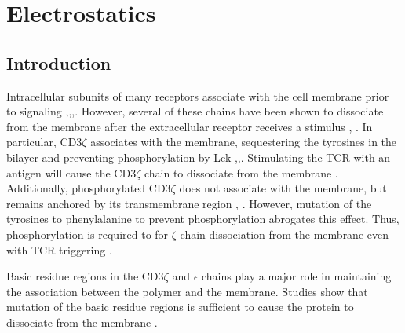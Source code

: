 \documentclass[../../AdvancementSummary.tex]{subfiles}
\begin{document}
\section{Electrostatics}

\subsection{Introduction}

Intracellular subunits of many receptors associate with the cell membrane prior to signaling \cite{Xu2008},\cite{Shi2013},\cite{Zhang2011},\cite{Dobbins2016}. 
However, several of these chains have been shown to dissociate from the membrane after the extracellular receptor receives a stimulus \cite{Zhang2011}, \cite{Dobbins2016}.
In particular, CD3$\zeta$ associates with the membrane, sequestering the tyrosines in the bilayer and preventing phosphorylation by Lck \cite{Aivazian2000},\cite{Zhang2011},\cite{Shi2013}.
Stimulating the TCR with an antigen will cause the CD3$\zeta$ chain to dissociate from the membrane \cite{Zhang2011}.
Additionally, phosphorylated CD3$\zeta$ does not associate with the membrane, but remains anchored by its transmembrane region  \cite{Aivazian2000}, \cite{Zhang2011}.
However, mutation of the tyrosines to phenylalanine to prevent phosphorylation abrogates this effect. Thus, phosphorylation is required to for $\zeta$ chain dissociation from the membrane even with TCR triggering  \cite{Zhang2011}.

Basic residue regions in the CD3$\zeta$ and $\epsilon$ chains play a major role in maintaining the association between the polymer and the membrane.
Studies show that mutation of the basic residue regions is sufficient to cause the protein to dissociate from the membrane \cite{Zhang2011}.
\end{document}
